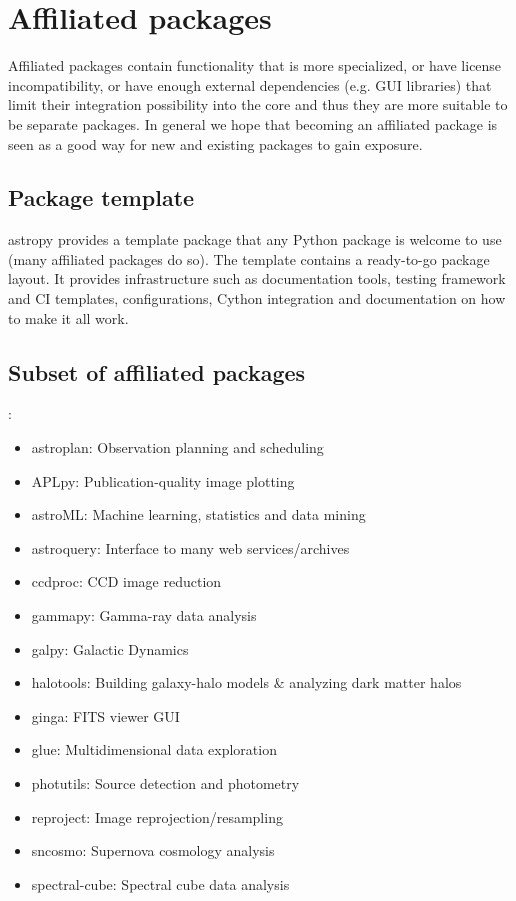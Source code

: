 \documentclass{iau}
\begin{document}
\section{Affiliated packages}

Affiliated packages contain functionality that is more specialized, or have
license incompatibility, or have enough external dependencies (e.g. GUI
libraries) that limit their integration possibility into the core and thus
they are more suitable to be separate packages. In general we hope that
becoming an affiliated package is seen as a good way for new and existing
packages to gain exposure.


\subsection{Package template}

astropy provides a template package that any Python package is welcome to
use (many affiliated packages do so).  The template contains a ready-to-go
package layout. It provides infrastructure such as documentation tools,
testing framework and CI templates, configurations, Cython integration and
documentation on how to make it all work.

\subsection{Subset of affiliated packages}:

\begin{itemize}
\item astroplan: Observation planning and scheduling
\item APLpy: Publication-quality image plotting
\item astroML: Machine learning, statistics and data mining
\item astroquery: Interface to many web services/archives
\item ccdproc: CCD image reduction
\item gammapy: Gamma-ray data analysis
\item galpy: Galactic Dynamics
\item halotools: Building galaxy-halo models \& analyzing dark matter halos
\item ginga: FITS viewer GUI
\item glue: Multidimensional data exploration
\item photutils: Source detection and photometry
\item reproject: Image reprojection/resampling
\item sncosmo: Supernova cosmology analysis
\item spectral-cube: Spectral cube data analysis
\end{itemize}
\end{document}

